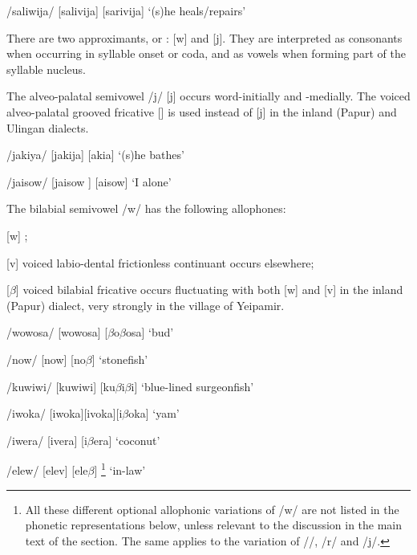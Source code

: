 /saliwija/  [sa{{\textprimstress}livija}] {\Tilde} [sa{{\textprimstress}rivija}]  `(s)he heals/repairs'

There are two approximants, or : [w] and [j].  They are interpreted as consonants when occurring in syllable onset or coda, and as vowels when forming part of the syllable nucleus. 

The alveo-palatal semivowel /j/ [j] occurs word-initially and -medially. The voiced alveo-palatal grooved fricative [{\textyogh}] is used instead of [j] in the inland (Papur) and Ulingan dialects.

/jakiya/  [ja{{\textprimstress}kija}] {\Tilde} [{\textyogh}a{{\textprimstress}ki}{\textyogh}a]  `(s)he bathes'

/jaisow/  [{{\textprimstress}jaisow} ] {\Tilde} [{{\textprimstress}}{\textyogh}aisow]  `I alone' 

The bilabial semivowel /w/ has the following allophones:

[w]  ;

[v]  voiced labio-dental frictionless continuant occurs elsewhere;

[$\beta $]  voiced bilabial fricative occurs fluctuating with both [w] and [v] in the inland (Papur) dialect, very strongly in the village of Yeipamir.

/wowosa/  [wo{{\textprimstress}wosa}] {\Tilde} [$\beta $o{{\textprimstress}$\beta $osa}]  `bud'

/now/  [now] {\Tilde} [no$\beta $]  `stonefish'

/kuwiwi/  [ku{{\textprimstress}wiwi}] {\Tilde} [ku{{\textprimstress}$\beta $i$\beta $i}]  `blue-lined surgeonfish'

/iwoka/  [i{{\textprimstress}woka}]{\Tilde}[i{{\textprimstress}voka}]{\Tilde}[i{{\textprimstress}$\beta $oka}]  `yam'

/iwera/  [i{{\textprimstress}vera}] {\Tilde} [i{{\textprimstress}$\beta $era}]  `coconut'

/elew/  [e{{\textprimstress}lev}] {\Tilde} [e{{\textprimstress}le$\beta $}] \footnote{All these different optional allophonic variations of /w/ are not listed in the phonetic representations below, unless relevant to the discussion in the main text of the section. The same applies to the variation of /{\textphi}/, /r/ and /j/.}  `in-law'

